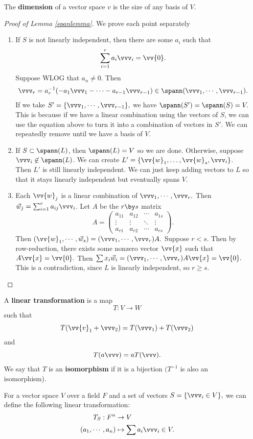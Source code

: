 \begin{definition}
The \textbf{dimension} of a vector space $v$ is the size of any basis of $V.$
\end{definition}

\begin{proof}[Proof of Lemma \ref{spanlemma}]

We prove each point separately
\begin{enumerate}
    \item If $S$ is not linearly independent, then there are some $a_i$ such that 
    \[
    \sum_{i=1}^r a_i \vvv_i = \vv{0}.
    \]
    Suppose WLOG that $a_n \neq 0.$ Then \[\vvv_r = a_r^{-1}(-a_1\vvv_1 - \cdots - a_{r-1}\vvv_{r-1}) \in \spann(\vvv_1, \cdots, \vvv_{r-1}).\] If we take $S' = \{\vvv_1, \cdots, \vvv_{r-1}\},$ we have $\spann(S') = \spann(S) = V.$ This is because if we have a linear combination using the vectors of $S$, we can use the equation above to turn it into a combination of vectors in $S'$. We can repeatedly remove until we have a basis of $V.$
    
    \item
    If $S \subset \spann(L)$, then $\spann(L) = V$ so we are done. 
    Otherwise, suppose $\vvv_i \not \in \spann(L)$. We can create $L' = \{\vv{w}_1, \ldots, \vv{w}_s, \vvv_i\}$. 
    Then $L'$ is still linearly independent. 
    We can just keep adding vectors to $L$ so that it stays linearly independent but eventually spans $V.$
    
    \item Each $\vv{w}_j$ is a linear combination of $\vvv_1 , \cdots, \vvv_r.$ Then $\vec{w}_j = \sum_{i = 1}^{r}  a_{ij} \vvv_i$. Let $A$ be the $r \by s $ matrix 
    \[
    A = 
    \begin{pmatrix}
    a_{11} & a_{12} & \cdots & a_{1s}\\
    \vdots & \vdots & \ddots & \vdots \\
    a_{r1} & a_{r2} & \cdots & a_{rs}
    \end{pmatrix}.
    \]
    Then $(\vv{w}_1, \cdots, \vec{w}_s) = (\vvv_1, \cdots, \vvv_r)A.$ Suppose $r < s.$ Then by row-reduction, there exists some nonzero vector $\vv{x}$ such that $A \vv{x} = \vv{0}.$ Then $\sum x_i \vec{w}_i = (\vvv_1, \cdots, \vvv_r)A\vv{x} = \vv{0}.$ This is a contradiction, since $L$ is linearly independent, so $r \geq s.$
\end{enumerate}
\end{proof}

\begin{definition}
A \textbf{linear transformation} is a map 
\[
T: V \rightarrow W
\]
such that 
\[
T(\vv{v}_1 + \vvv_2) = T(\vvv_1) + T(\vvv_2) 
\]
and 
\[
T(a\vvv) = aT(\vvv).
\] We say that $T$ is an \textbf{isomorphism} if it is a bijection $(T^{-1}$ is also an isomorphism). 
\end{definition}
For a vector space $V$ over a field $F$ and a set of vectors $S = \{\vvv_i \in V\},$ we can define the following linear transformation:
\begin{align*}
T_S: F^n &\rightarrow V \\
(a_1, \cdots, a_n) &\mapsto \sum a_i \vvv_i \in V.
\end{align*}

